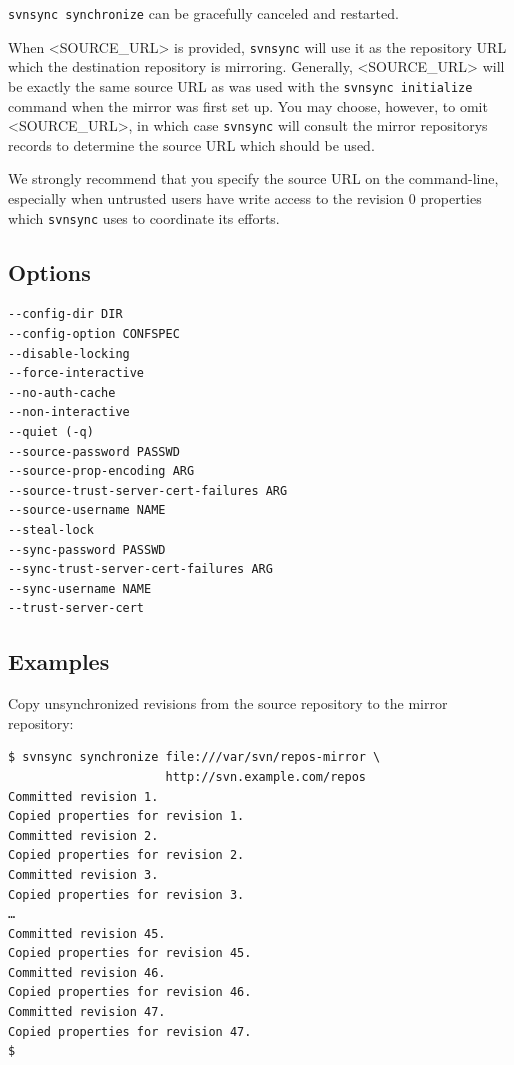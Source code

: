 \texttt{svnsync\ synchronize} can be gracefully canceled and restarted.

When \textless SOURCE\_URL\textgreater{} is provided, \texttt{svnsync}
will use it as the repository URL which the destination repository is
mirroring. Generally, \textless SOURCE\_URL\textgreater{} will be
exactly the same source URL as was used with the
\texttt{svnsync\ initialize} command when the mirror was first set up.
You may choose, however, to omit \textless SOURCE\_URL\textgreater, in
which case \texttt{svnsync} will consult the mirror
repository\textquotesingle s records to determine the source URL which
should be used.

We strongly recommend that you specify the source URL on the
command-line, especially when untrusted users have write access to the
revision 0 properties which \texttt{svnsync} uses to coordinate its
efforts.

\subsection{Options}

\begin{verbatim}
--config-dir DIR
--config-option CONFSPEC
--disable-locking
--force-interactive
--no-auth-cache
--non-interactive
--quiet (-q)
--source-password PASSWD
--source-prop-encoding ARG
--source-trust-server-cert-failures ARG
--source-username NAME
--steal-lock
--sync-password PASSWD
--sync-trust-server-cert-failures ARG
--sync-username NAME
--trust-server-cert
\end{verbatim}

\subsection{Examples}

Copy unsynchronized revisions from the source repository to the mirror
repository:

\begin{verbatim}
$ svnsync synchronize file:///var/svn/repos-mirror \
                      http://svn.example.com/repos
Committed revision 1.
Copied properties for revision 1.
Committed revision 2.
Copied properties for revision 2.
Committed revision 3.
Copied properties for revision 3.
…
Committed revision 45.
Copied properties for revision 45.
Committed revision 46.
Copied properties for revision 46.
Committed revision 47.
Copied properties for revision 47.
$
\end{verbatim}

